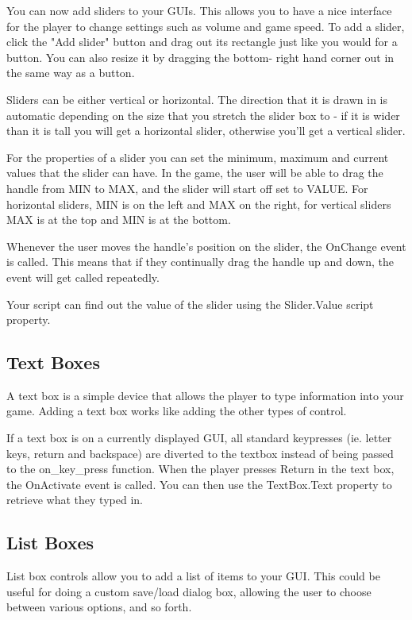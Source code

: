 You can now add sliders to your GUIs. This allows you to have a nice interface
for the player to change settings such as volume and game speed.
To add a slider, click the "Add slider" button and drag out its rectangle just
like you would for a button. You can also resize it by dragging the bottom-
right hand corner out in the same way as a button.

Sliders can be either vertical or horizontal. The direction that it is drawn
in is automatic depending on the size that you stretch the slider box to - if
it is wider than it is tall you will get a horizontal slider, otherwise you'll
get a vertical slider.

For the properties of a slider you can set the minimum, maximum and current
values that the slider can have. In the game, the user will be able to drag
the handle from MIN to MAX, and the slider will start off set to VALUE.
For horizontal sliders, MIN is on the left and MAX on the right, for vertical
sliders MAX is at the top and MIN is at the bottom.

Whenever the user moves the handle's position on the slider, the OnChange event is
called. This means that if they continually drag the handle up and down,
the event will get called repeatedly.

Your script can find out the value of the slider using the Slider.Value script property.

\subsection{Text Boxes}%

A text box is a simple device that allows the player to type information into
your game. Adding a text box works like adding the other types of control.

If a text box is on a currently displayed GUI, all standard keypresses (ie.
letter keys, return and backspace) are diverted to the textbox instead of
being passed to the on_key_press function. When the player presses Return in
the text box, the OnActivate event is called. You can then use the TextBox.Text
property to retrieve what they typed in.

\subsection{List Boxes}%

List box controls allow you to add a list of items to your GUI. This could
be useful for doing a custom save/load dialog box, allowing the user to
choose between various options, and so forth.

